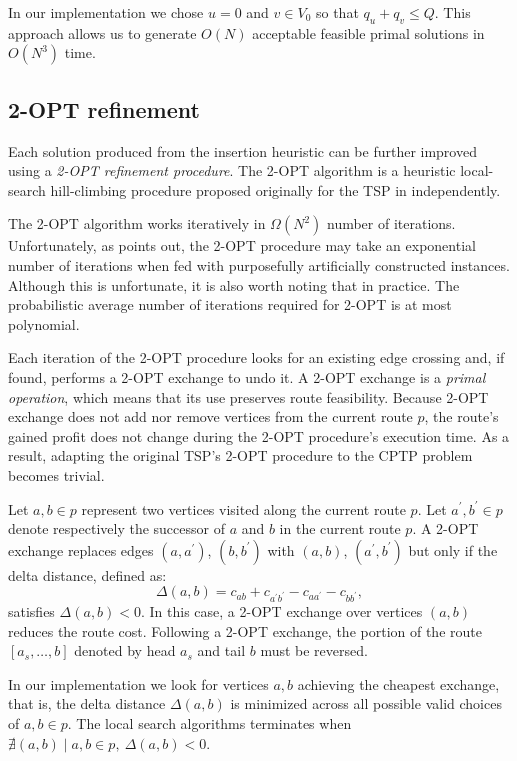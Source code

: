 In our implementation we chose $u = 0$ and $v \in V_0$ so that $q_u + q_v \le Q$.
This approach allows us to generate $O(N)$ acceptable feasible primal solutions in $O(N^3)$ time.

\subsection{2-OPT refinement}
\label{sec:impl-2opt-refinement}

Each solution produced from the insertion heuristic
can be further improved using a \textit{2-OPT refinement procedure}.
The 2-OPT algorithm is a heuristic local-search hill-climbing procedure
proposed originally for the TSP in \textcite{flood1956, croes1958} independently.

The 2-OPT algorithm works iteratively in $\Omega(N^2)$ number of iterations.
Unfortunately,
as \textcite{chandra1999} points out,
the 2-OPT procedure may take an exponential number of iterations
when fed with purposefully artificially constructed instances.
Although this is unfortunate, it is also worth noting that in practice.
The probabilistic average number of iterations required for 2-OPT is at most polynomial.

Each iteration of the 2-OPT procedure looks for an existing edge crossing and, if found,
performs a 2-OPT exchange to undo it.
A 2-OPT exchange is a \textit{primal operation},
which means that its use preserves route feasibility.
Because 2-OPT exchange does not add nor remove vertices from the current route $p$,
the route's gained profit does not change during
the 2-OPT procedure's execution time.
As a result, adapting the original TSP's 2-OPT procedure to the CPTP problem becomes trivial.

Let $a, b \in p$ represent two vertices visited along the current route $p$.
Let $a^\prime, b^\prime \in p$ denote respectively the successor of $a$ and $b$ in the current route $p$.
A 2-OPT exchange replaces edges $(a, a^\prime)$, $(b, b^\prime)$
with $(a, b)$, $(a^\prime, b^\prime)$
but only if the delta distance, defined as:
\begin{equation}
	\Delta(a, b) = c_{a b} + c_{a^\prime b^\prime} - c_{a a^\prime} - c_{b b^\prime},
\end{equation}
satisfies $\Delta(a, b) < 0$.
In this case, a 2-OPT exchange over vertices $(a, b)$ reduces the route cost.
Following a 2-OPT exchange, the portion of the route $[a_s, \dots, b]$
denoted by head $a_s$ and tail $b$ must be reversed.

In our implementation
we look for vertices $a, b$ achieving the cheapest exchange,
that is, the delta distance $\Delta(a, b)$ is minimized
across all possible valid choices of $a, b \in p$.
The local search algorithms terminates when $\nexists (a, b) \mid a, b \in p,\ \Delta(a, b) < 0$.

